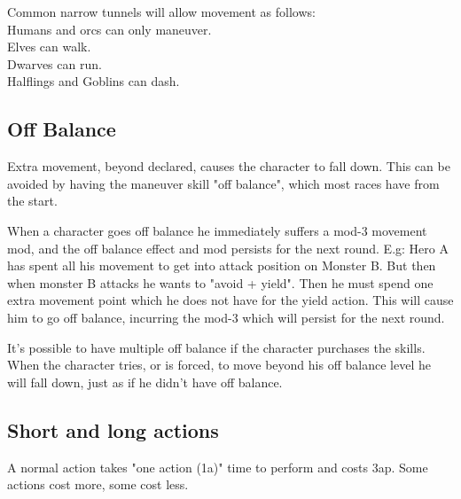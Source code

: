 Common narrow tunnels will allow movement as follows: \\
Humans and orcs can only maneuver. \\
Elves can walk. \\
Dwarves can run. \\
Halflings and Goblins can dash. \\


\subsection*{Off Balance}
Extra movement, beyond declared, causes the character to fall down. This can be avoided by having the maneuver skill "off balance", which most races have from the start.

When a character goes off balance he immediately suffers a mod-3 movement mod, and the off balance effect and mod persists for the next round. E.g: Hero A has spent all his movement to get into attack position on Monster B. But then when monster B attacks he wants to "avoid + yield". Then he must spend one extra movement point which he does not have for the yield action. This will cause him to go off balance, incurring the mod-3 which will persist for the next round.

It's possible to have multiple off balance if the character purchases the skills.
When the character tries, or is forced, to move beyond his off balance level he will fall down, just as if he didn't have off balance.



















\subsection*{Short and long actions}
A normal action takes "one action (1a)" time to perform and costs 3ap. Some actions cost more, some cost less.

